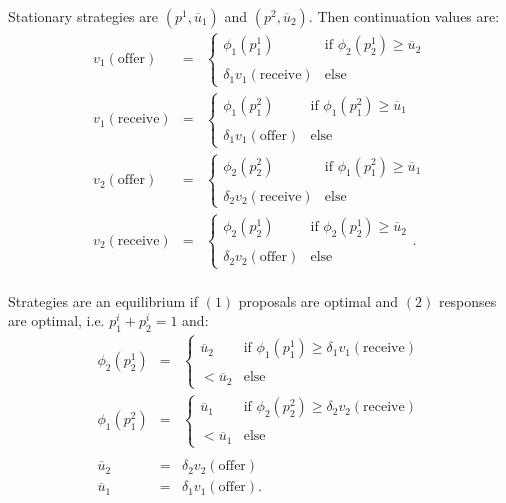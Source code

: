 \documentclass[12pt]{article}
\newcommand{\n}{\noindent}
\newcommand{\s}{\vspace{5mm}}
\begin{document}
\s
\n  Stationary strategies are $(p^1,\overline{u}_1)$ and $(p^2,\overline{u}_2)$.  Then continuation values are:
\begin{eqnarray*}
v_1(\mbox{offer})&=&\left\{\begin{array}{ll}
\phi_1(p_1^1)&\mbox{if } \phi_2(p_2^1)\geq \overline{u}_2\\
&\\
\delta_1v_1(\mbox{receive})&\mbox{else}
\end{array}\right.\\
v_1(\mbox{receive})&=&\left\{\begin{array}{ll}
\phi_1(p_1^2)&\mbox{if }\phi_1(p_1^2)\geq\overline{u}_1\\
&\\
\delta_1v_1(\mbox{offer})&\mbox{else}
\end{array}\right.\\
v_2(\mbox{offer})&=&\left\{\begin{array}{ll}
\phi_2(p_2^2)&\mbox{if } \phi_1(p_1^2)\geq \overline{u}_1\\
&\\
\delta_2v_2(\mbox{receive})&\mbox{else}
\end{array}\right.\\
v_2(\mbox{receive})&=&\left\{\begin{array}{ll}
\phi_2(p_2^1)&\mbox{if }\phi_2(p_2^1)\geq\overline{u}_2\\
&\\
\delta_2v_2(\mbox{offer})&\mbox{else}
\end{array}\right..\\
\end{eqnarray*}

\s
\n  Strategies are an equilibrium if $(1)$ proposals are optimal and $(2)$ responses are optimal, i.e. $p_1^i+p_2^i=1$ and:
\begin{eqnarray}
\phi_2(p_2^1)&=&\left\{\begin{array}{ll}
\overline{u}_2&\mbox{if }\phi_1(p_1^1)\geq \delta_1v_1(\mbox{receive})\\
&\\
<\overline{u}_2&\mbox{else}
\end{array}\right.\\
\nonumber\phi_1(p_1^2)&=&\left\{\begin{array}{ll}
\overline{u}_1&\mbox{if }\phi_2(p_2^2)\geq\delta_2v_2(\mbox{receive})\\
&\\
<\overline{u}_1&\mbox{else}
\end{array}\right.\\
\nonumber&&\\
\overline{u}_2&=&\delta_2v_2(\mbox{offer})\\
\nonumber\overline{u}_1&=&\delta_1v_1(\mbox{offer}).
\end{eqnarray}
\end{document}

